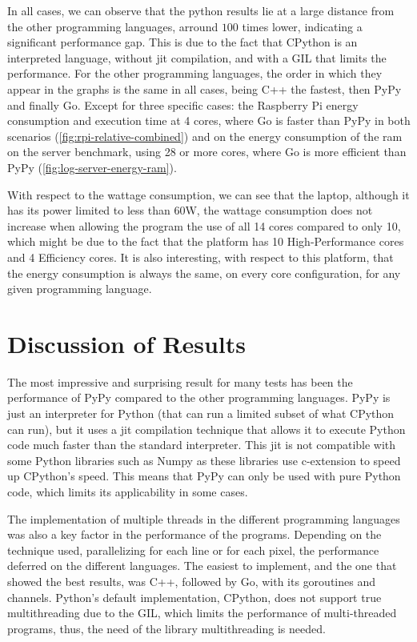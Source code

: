 

In all cases, we can observe that the python results lie at a large distance from the other programming languages, arround $100$ times lower, indicating a significant performance gap. This is due to the fact that \gls{CPython} is an interpreted language, without \gls{jit} compilation, and with a \gls{GIL} that limits the performance. For the other programming languages, the order in which they appear in the graphs is the same in all cases, being C++ the fastest, then PyPy and finally Go. Except for three specific cases: the Raspberry Pi energy consumption and execution time at 4 cores, where Go is faster than PyPy in both scenarios (\autoref{fig:rpi-relative-combined}) and on the energy consumption of the \gls{ram} on the server benchmark, using 28 or more cores, where Go is more efficient than PyPy (\autoref{fig:log-server-energy-ram}).

With respect to the wattage consumption, we can see that the laptop, although it has its power limited to less than 60W, the wattage consumption does not increase when allowing the program the use of all 14 cores compared to only 10, which might be due to the fact that the platform has 10 High-Performance cores and 4 Efficiency cores. It is also interesting, with respect to this platform, that the energy consumption is always the same, on every core configuration, for any given programming language.



\section{Discussion of Results}

The most impressive and surprising result for many tests has been the performance of PyPy compared to the other programming languages. PyPy is just an interpreter for Python (that can run a limited subset of what \gls{CPython} can run), but it uses a \gls{jit} compilation technique that allows it to execute Python code much faster than the standard interpreter. This \gls{jit} is not compatible with some Python libraries such as Numpy \cite{numpy} as these libraries use \gls{c-extension} to speed up \gls{CPython}'s speed. This means that PyPy can only be used with pure Python code, which limits its applicability in some cases.

The implementation of multiple threads in the different programming languages was also a key factor in the performance of the programs. Depending on the technique used, parallelizing for each line or for each pixel, the performance deferred on the different languages. The easiest to implement, and the one that showed the best results, was C++, followed by Go, with its \glspl{goroutine} and \glspl{channel}. Python's default implementation, \gls{CPython}, does not support true multithreading due to the \gls{GIL}, which limits the performance of multi-threaded programs, thus, the need of the library multithreading is needed.


